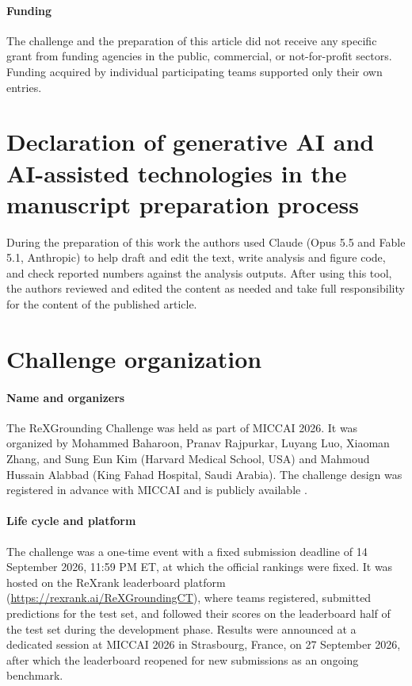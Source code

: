 \documentclass[final,5p,times,twocolumn,authoryear,numafflabel]{elsarticle}
\begin{document}
\paragraph{Funding} The challenge and the preparation of this article did not
receive any specific grant from funding agencies in the public, commercial, or
not-for-profit sectors. Funding acquired by individual participating teams
supported only their own entries.

\section*{Declaration of generative AI and AI-assisted technologies in the manuscript preparation process}
During the preparation of this work the authors used Claude (Opus 5.5 and
Fable 5.1, Anthropic) to help draft and edit the text, write analysis and figure code, and check reported
numbers against the analysis outputs. After using this tool, the authors
reviewed and edited the content as needed and take full responsibility for the
content of the published article.




\appendix
\renewcommand{\theHtable}{app.\thetable}\renewcommand{\theHfigure}{app.\thefigure}

\section{Challenge organization}
\label{app:organization}

\paragraph{Name and organizers}
The ReXGrounding Challenge was held as part of MICCAI 2026. It was organized
by Mohammed Baharoon, Pranav Rajpurkar, Luyang Luo, Xiaoman Zhang, and
Sung Eun Kim (Harvard Medical School, USA) and Mahmoud Hussain Alabbad (King
Fahad Hospital, Saudi Arabia). The challenge design was registered in advance
with MICCAI and is publicly available \citep{baharoon2026design}.

\paragraph{Life cycle and platform}
The challenge was a one-time event with a fixed submission deadline of
14 September 2026, 11:59 PM ET, at which the official rankings were
fixed. It was hosted on the ReXrank leaderboard platform
\citep{zhang2024rexrank}
(\url{https://rexrank.ai/ReXGroundingCT}), where teams registered, submitted
predictions for the test set, and followed their scores on the leaderboard half of the
test set during the development phase. Results were announced at a dedicated
session at MICCAI 2026 in Strasbourg, France, on 27 September 2026, after which
the leaderboard reopened for new submissions as an ongoing benchmark.
\end{document}
